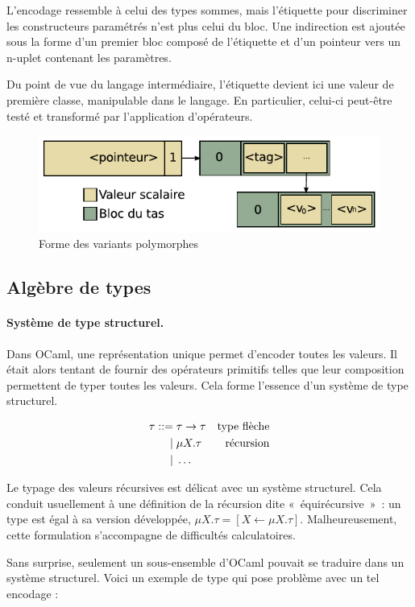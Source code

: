 L'encodage ressemble à celui des types sommes, mais l'étiquette pour
discriminer les constructeurs paramétrés n'est plus celui du bloc. Une
indirection est ajoutée sous la forme d'un premier bloc composé de l'étiquette
et d'un pointeur vers un n-uplet contenant les paramètres.

Du point de vue du langage intermédiaire, l'étiquette devient ici une valeur de
première classe, manipulable dans le langage.  En particulier, celui-ci
peut-être testé et transformé par l'application d'opérateurs.

\begin{figure}
\centering
\includegraphics{media/ocaml_variant}
\caption{Forme des variants polymorphes}
\end{figure}

\subsection{Algèbre de types}

\paragraph{Système de type structurel.}
Dans OCaml, une représentation unique permet d'encoder toutes les valeurs. Il
était alors tentant de fournir des opérateurs primitifs telles que leur
composition permettent de typer toutes les valeurs. Cela forme l'essence d'un
système de type structurel.

\begin{align*}
  \tau ::=& \; \tau \rightarrow \tau
    & \text{type flèche}
  \\ |& \;     \mu X . \tau
    & \text{récursion}
  \\ |& \;     \ldots
\end{align*}

Le typage des valeurs récursives est délicat avec un système structurel. Cela
conduit usuellement à une définition de la récursion dite « équirécursive » :
un type est égal à sa version développée,
  $\mu X . \tau = [X \leftarrow \mu X . \tau]$.
Malheureusement, cette formulation s'accompagne de difficultés calculatoires.

Sans surprise, seulement un sous-ensemble d'OCaml pouvait se traduire dans un
système structurel. Voici un exemple de type qui pose problème avec un tel
encodage :

